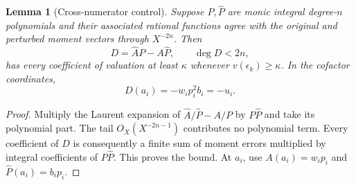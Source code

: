 \documentclass[11pt,letterpaper]{article}
\newtheorem{lemma}[theorem]{Lemma}
\theoremstyle{definition}
\theoremstyle{remark}
\newcommand{\Ph}{\widehat P}
\newcommand{\Ah}{\widehat A}
\begin{document}
\begin{lemma}[Cross-numerator control]\label{prony:lem:cross}
Suppose $P,\Ph$ are monic integral degree-$n$ polynomials and their associated
rational functions agree with the original and perturbed moment vectors
through $X^{-2n}$. Then
\begin{equation}\label{prony:eq:cross}
 D=\Ah P-A\Ph,\qquad \deg D<2n,
\end{equation}
has every coefficient of valuation at least $\kappa$ whenever
$v(\epsilon_k)\ge\kappa$. In the cofactor coordinates,
\begin{equation}\label{prony:eq:Dvalues}
 D(a_i)=-w_i p_i^2b_i=-u_i.
\end{equation}
\end{lemma}
\begin{proof}
Multiply the Laurent expansion of $\Ah/\Ph-A/P$ by $P\Ph$ and take its
polynomial part. The tail $O_X(X^{-2n-1})$ contributes no polynomial term.
Every coefficient of $D$ is consequently a finite sum of moment errors
multiplied by integral coefficients of $P\Ph$. This proves the bound.
At $a_i$, use $A(a_i)=w_i p_i$ and $\Ph(a_i)=b_i p_i$.
\end{proof}
\end{document}
